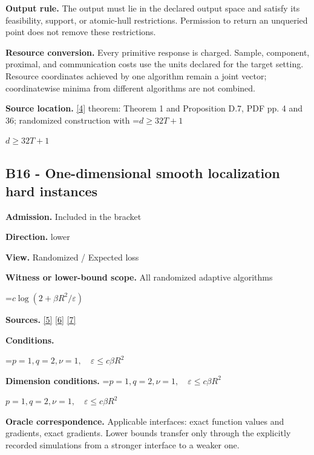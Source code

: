 \documentclass[10pt,a4paper]{article}
\newcommand{\AtlasMath}[1]{\par\begingroup\centering\setbox0=\hbox{$\displaystyle #1$}\ifdim\wd0>1.4\linewidth\typeout{ATLAS WIDE FORMULA: \the\wd0}\fi\ifdim\wd0>\linewidth\resizebox{\linewidth}{!}{\box0}\else\box0\fi\par\endgroup}
\newcommand{\AtlasInlineMath}[1]{\begingroup\setbox0=\hbox{$#1$}\ifdim\wd0>.4\linewidth\endgroup\AtlasMath{#1}\else\endgroup$#1$\fi}
\begin{document}
\textbf{Output rule.} The output must lie in the declared output space and satisfy its feasibility, support, or atomic-hull restrictions. Permission to return an unqueried point does not remove these restrictions.



\textbf{Resource conversion.} Every primitive response is charged. Sample, component, proximal, and communication costs use the units declared for the target setting. Resource coordinates achieved by one algorithm remain a joint vector; coordinatewise minima from different algorithms are not combined.



\textbf{Source location.} \href{https://arxiv.org/pdf/2609.32910}{[4]} theorem: Theorem 1 and Proposition D.7, PDF pp. 4 and 36; randomized construction with \AtlasInlineMath{d\ge32T+1}



\subsection{B16 - One-dimensional smooth localization hard instances}


\textbf{Admission.} Included in the bracket



\textbf{Direction.} lower



\textbf{View.} Randomized / Expected loss



\textbf{Witness or lower-bound scope.} All randomized adaptive algorithms



\AtlasMath{c\log(2+\beta R^2/\varepsilon)}


\textbf{Sources.} \href{https://arxiv.org/pdf/2101.09740v2}{[5]} \href{https://arxiv.org/pdf/2609.33360v2}{[6]} \href{https://arxiv.org/pdf/2609.10874}{[7]}



\textbf{Conditions.}
\AtlasMath{p=1,q=2,\nu=1,\quad\varepsilon\le c\beta R^2}




\textbf{Dimension conditions.} \AtlasInlineMath{p=1,q=2,\nu=1,\quad\varepsilon\le c\beta R^2}



\textbf{Oracle correspondence.} Applicable interfaces: exact function values and gradients, exact gradients. Lower bounds transfer only through the explicitly recorded simulations from a stronger interface to a weaker one.
\end{document}
